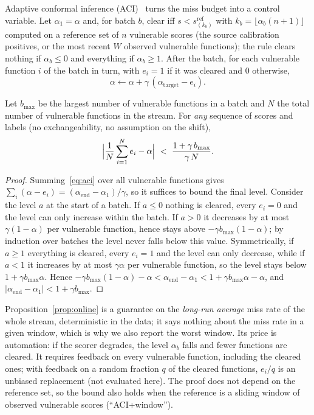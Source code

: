 Adaptive conformal inference (ACI)~\cite{gibbs2021adaptive} turns the miss budget into a control variable. Let $\alpha_1=\alpha$ and, for batch $b$, clear iff $s<s^{\mathrm{ref}}_{(k_b)}$ with $k_b=\lfloor\alpha_b(n+1)\rfloor$ computed on a reference set of $n$ vulnerable scores (the source calibration positives, or the most recent $W$ observed vulnerable functions); the rule clears nothing if $\alpha_b\le0$ and everything if $\alpha_b\ge1$. After the batch, for each vulnerable function $i$ of the batch in turn, with $e_i=1$ if it was cleared and $0$ otherwise,
\begin{equation}
  \alpha\leftarrow\alpha+\gamma\,(\alpha_{\mathrm{target}}-e_i).\label{eq:aci}
\end{equation}
\begin{proposition}\label{prop:online}
Let $b_{\max}$ be the largest number of vulnerable functions in a batch and $N$ the total number of vulnerable functions in the stream. For \emph{any} sequence of scores and labels (no exchangeability, no assumption on the shift),
\[
\Bigl|\frac1N\sum_{i=1}^N e_i-\alpha\Bigr|\ <\ \frac{1+\gamma\,b_{\max}}{\gamma\,N}.
\]
\end{proposition}
\begin{proof}
Summing~\eqref{eq:aci} over all vulnerable functions gives $\sum_i(\alpha-e_i)=(\alpha_{\mathrm{end}}-\alpha_1)/\gamma$, so it suffices to bound the final level. Consider the level $a$ at the start of a batch. If $a\le0$ nothing is cleared, every $e_i=0$ and the level can only increase within the batch. If $a>0$ it decreases by at most $\gamma(1-\alpha)$ per vulnerable function, hence stays above $-\gamma b_{\max}(1-\alpha)$; by induction over batches the level never falls below this value. Symmetrically, if $a\ge1$ everything is cleared, every $e_i=1$ and the level can only decrease, while if $a<1$ it increases by at most $\gamma\alpha$ per vulnerable function, so the level stays below $1+\gamma b_{\max}\alpha$. Hence $-\gamma b_{\max}(1-\alpha)-\alpha<\alpha_{\mathrm{end}}-\alpha_1<1+\gamma b_{\max}\alpha-\alpha$, and $\lvert\alpha_{\mathrm{end}}-\alpha_1\rvert<1+\gamma b_{\max}$.
\end{proof}
Proposition~\ref{prop:online} is a guarantee on the \emph{long-run average} miss rate of the whole stream, deterministic in the data; it says nothing about the miss rate in a given window, which is why we also report the worst window. Its price is automation: if the scorer degrades, the level $\alpha_b$ falls and fewer functions are cleared. It requires feedback on every vulnerable function, including the cleared ones; with feedback on a random fraction $q$ of the cleared functions, $e_i/q$ is an unbiased replacement (not evaluated here). The proof does not depend on the reference set, so the bound also holds when the reference is a sliding window of observed vulnerable scores (``ACI+window'').

